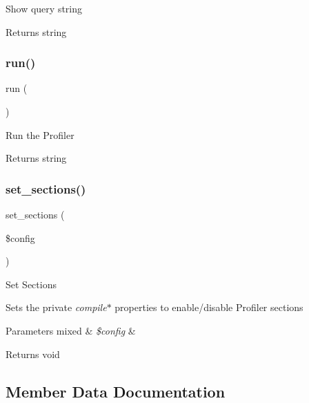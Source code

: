 Show query string

\begin{DoxyReturn}{Returns}
string 
\end{DoxyReturn}
\mbox{\label{class_c_i___profiler_afb0fafe7e02a3ae1993c01c19fad2bae}} 
\subsubsection{\texorpdfstring{run()}{run()}}
{\footnotesize\ttfamily run (\begin{DoxyParamCaption}{ }\end{DoxyParamCaption})}

Run the Profiler

\begin{DoxyReturn}{Returns}
string 
\end{DoxyReturn}
\mbox{\label{class_c_i___profiler_a81c587d7a2a249d05f28c96a135591f7}} 
\subsubsection{\texorpdfstring{set\+\_\+sections()}{set\_sections()}}
{\footnotesize\ttfamily set\+\_\+sections (\begin{DoxyParamCaption}\item[{}]{\$config }\end{DoxyParamCaption})}

Set Sections

Sets the private {\itshape compile}$\ast$ properties to enable/disable Profiler sections


\begin{DoxyParams}[1]{Parameters}
mixed & {\em \$config} & \\
\hline
\end{DoxyParams}
\begin{DoxyReturn}{Returns}
void 
\end{DoxyReturn}


\subsection{Member Data Documentation}
\mbox{\label{class_c_i___profiler_ae30756727f63d3be7422d378676f667d}} 
